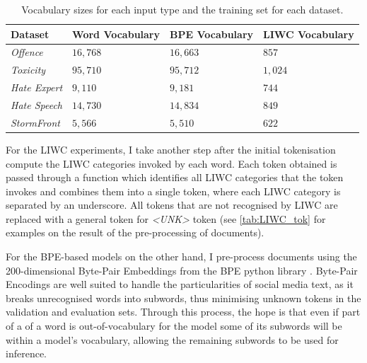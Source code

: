 \begin{table}[]
  \centering
  \begin{tabular}{llll}
    Dataset              & Word Vocabulary & BPE Vocabulary & LIWC Vocabulary \\\hline
    \textit{Offence}     & $16,768$        & $16,663$       & $857$           \\
    \textit{Toxicity}    & $95,710$        & $95,712$       & $1,024$         \\
    \textit{Hate Expert} & $9,110$         & $9,181$        & $744$           \\
    \textit{Hate Speech} & $14,730$        & $14,834$       & $849$           \\
    \textit{StormFront}  & $5,566$         & $5,510$        & $622$
  \end{tabular}
  \caption{Vocabulary sizes for each input type and the training set for each dataset.}
  \label{tab:vocab_sizes}
\end{table}

For the LIWC experiments, I take another step after the initial tokenisation  compute the LIWC categories invoked by each word.
Each token obtained is passed through a function which identifies all LIWC categories that the token invokes and combines them into a single token, where each LIWC category is separated by an underscore.
All tokens that are not recognised by LIWC are replaced with a general token for \textit{<UNK>} token (see \cref{tab:LIWC_tok} for examples on the result of the pre-processing of documents).

For the BPE-based models on the other hand, I pre-process documents  using the 200-dimensional Byte-Pair Embeddings from the BPE python library \citep{Heinzerling:2018}.
Byte-Pair Encodings are well suited to handle the particularities of social media text, as it breaks unrecognised words into  subwords, thus minimising unknown tokens in the validation and evaluation sets.
Through this process, the hope is that even if part of a of a word is out-of-vocabulary for the model some of its subwords will be within a model's vocabulary, allowing the remaining subwords to be used for inference.

\begin{table}
  \centering
  \caption{Word token and BPE representation.}
  \label{tab:bpe_tok}
\end{table}

